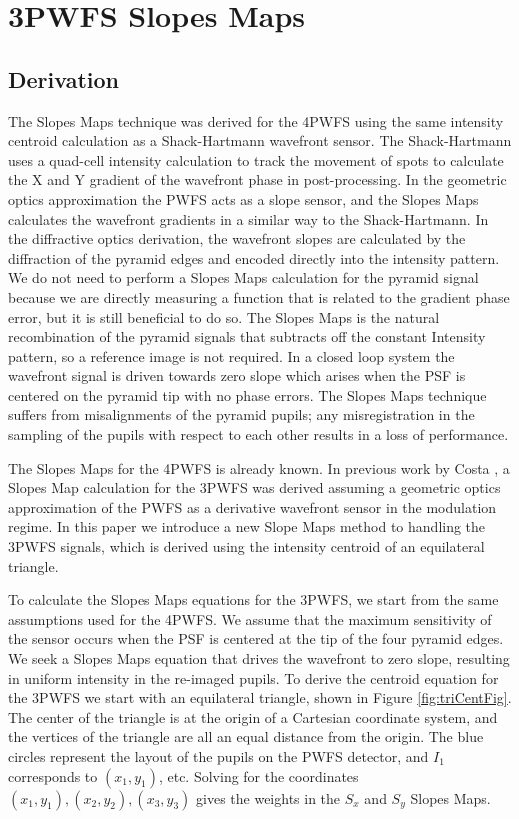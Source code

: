 \section{3PWFS Slopes Maps}\label{Slopes}

\subsection{Derivation}\label{SlopesDerivation}

The Slopes Maps technique was derived for the 4PWFS using the same intensity centroid calculation as a Shack-Hartmann wavefront sensor. The Shack-Hartmann uses a quad-cell intensity calculation to track the movement of spots to calculate the X and Y gradient of the wavefront phase in post-processing. In the geometric optics approximation the PWFS acts as a slope sensor, and the Slopes Maps calculates the wavefront gradients in a similar way to the Shack-Hartmann. In the diffractive optics derivation, the wavefront slopes are calculated by the diffraction of the pyramid edges and encoded directly into the intensity pattern. We do not need to perform a Slopes Maps calculation for the pyramid signal because we are directly measuring a function that is related to the gradient phase error, but it is still beneficial to do so. The Slopes Maps is the natural recombination of the pyramid signals that subtracts off the constant Intensity pattern, so a reference image is not required. In a closed loop system the wavefront signal is driven towards  zero slope which arises when the PSF is centered on the pyramid tip with no phase errors. The Slopes Maps technique suffers from misalignments of the pyramid pupils; any misregistration in the sampling of the pupils with respect to each other results in a loss of performance. 

The Slopes Maps for the 4PWFS is already known. In previous work by Costa \cite{buchler2004development}, a Slopes Map calculation for the 3PWFS was derived assuming a geometric optics approximation of the PWFS as a derivative wavefront sensor in the modulation regime. In this paper we introduce a new Slope Maps method to handling the 3PWFS signals, which is derived using the intensity centroid of an equilateral triangle.

To calculate the Slopes Maps equations for the 3PWFS, we start from the same assumptions used for the 4PWFS. We assume that the maximum sensitivity of the sensor occurs when the PSF is centered at the tip of the four pyramid edges. We seek a Slopes Maps equation that drives the wavefront to zero slope, resulting in uniform intensity in the re-imaged pupils. To derive the centroid equation for the 3PWFS we start with an equilateral triangle, shown in Figure \ref{fig:triCentFig}. The center of the triangle is at the origin of a Cartesian coordinate system, and the vertices of the triangle are all an equal distance from the origin. The blue circles represent the layout of the pupils on the PWFS detector, and $I_1$ corresponds to $(x_1, y_1)$, etc. Solving for the coordinates $(x_1,y_1),(x_2,y_2), (x_3,y_3)$ gives the weights in the $S_x$ and $S_y$ Slopes Maps. 


